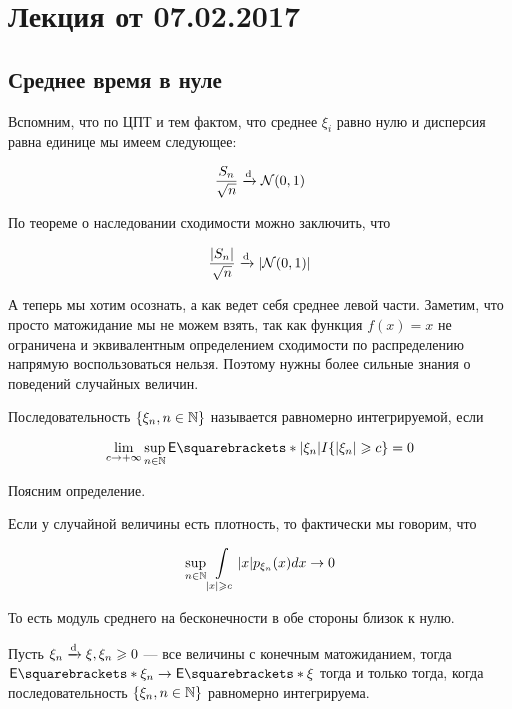 \section{Лекция от 07.02.2017}

\subsection{Среднее время в нуле}

Вспомним, что по ЦПТ и тем фактом, что среднее $\xi_i$ равно нулю и дисперсия равна 
единице мы имеем следующее:

\[
  \frac{S_n}{\sqrt{n}} \xrightarrow{\mathrm{d}} \mathcal{N}(0, 1)
\]

По теореме о наследовании сходимости можно заключить, что

\[
  \frac{|S_n|}{\sqrt{n}} \xrightarrow{\mathrm{d}} |\mathcal{N}(0, 1)|
\]

А теперь мы хотим осознать, а как ведет себя среднее левой части. Заметим, что
просто матожидание мы не можем взять, так как функция $f(x) = x$ не ограничена
и эквивалентным определением сходимости по распределению напрямую воспользоваться
нельзя. Поэтому нужны более сильные знания о поведений случайных величин.

\begin{definition}
  Последовательность $\{\xi_n, n \in \mathbb{N}\}$ называется равномерно интегрируемой,
  если

  \[
    \lim\limits_{c \to +\infty} \sup\limits_{n \in \N} \E{|\xi_n|I\{|\xi_n| \geq c\}} = 0
  \]
\end{definition}

Поясним определение.

Если у случайной величины есть плотность, то фактически мы говорим, что

\[
  \sup\limits_{n \in \mathbb{N}} \int\limits_{|x| \geqslant c} |x| p_{\xi_n}(x) dx \to 0
\]

То есть модуль среднего на бесконечности в обе стороны близок к нулю.

\begin{theorem}
  Пусть $\xi_n \xrightarrow{\mathrm{d}} \xi, \xi_n \geqslant 0$ --- все величины с конечным матожиданием,
  тогда $\E{\xi_n} \to \E{\xi}$ тогда
  и только тогда, когда последовательность $\{\xi_n, n \in \mathbb{N}\}$ равномерно 
  интегрируема.
\end{theorem}


